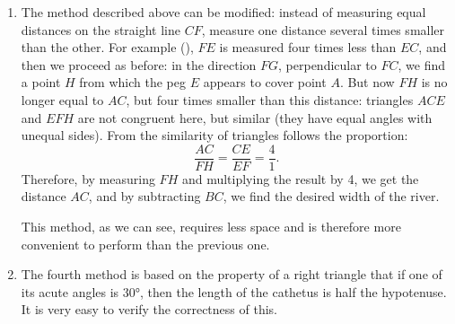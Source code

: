 \begin{enumerate}
\item The method described above can be modified: instead of measuring equal distances on the straight line $CF$, measure one distance several times smaller than the other. For example (), $FE$ is measured four times less than $EC$, and then we proceed as before: in the direction $FG$, perpendicular to $FC$, we find a point $H$ from which the peg $E$ appears to cover point $A$. But now $FH$ is no longer equal to $AC$, but four times smaller than this distance: triangles $ACE$ and $EFH$ are not congruent here, but similar (they have equal angles with unequal sides). From the similarity of triangles follows the proportion:
\begin{equation*}%
\frac{AC}{FH} = \frac{CE}{EF} = \frac{4}{1}.
\end{equation*}
Therefore, by measuring $FH$ and multiplying the result by 4, we get the distance $AC$, and by subtracting $BC$, we find the desired width of the river.

This method, as we can see, requires less space and is therefore more convenient to perform than the previous one.




\item The fourth method is based on the property of a right triangle that if one of its acute angles is \ang{30}, then the length of the cathetus is half the hypotenuse. It is very easy to verify the correctness of this. 


\end{enumerate}
